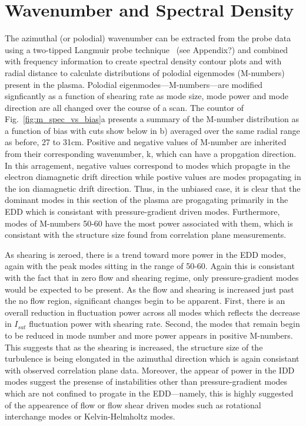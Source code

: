 \documentclass[aip,pop,amsmath,amssymb,preprint,superscriptaddress]{revtex4-1} %
\begin{document}
\section{Wavenumber and Spectral Density}

The azimuthal (or polodial) wavenumber can be extracted from the probe data using  a two-tipped Langmuir probe technique~\cite{beall82} (see Appendix?) and combined with frequency information to create spectral density contour plots and with radial distance to calculate distributions of polodial eigenmodes (M-numbers) present in the plasma. Polodial eigenmodes---M-numbers---are modified signficantly as a function of shearing rate as mode size, mode power and mode direction are all changed over the course of a scan. The countor of Fig.~\ref{fig:m_spec_vs_bias}a presents a summary of the M-number distribution as a function of bias with cuts show below in b) averaged over the same radial range as before, 27 to 31cm. Positive and negative values of M-number are inherited from their corresponding wavenumber, k, which can have a propgation direction. In this arragement, negative values correspond to modes which propagte in the electron diamagnetic drift direction while postive values are modes propagating in the ion diamagnetic drift direction. Thus, in the unbiased case, it is clear that the dominant modes in this section of the plasma are progagating primarily in the EDD which is consistant with pressure-gradient driven modes. Furthermore, modes of M-numbers 50-60 have the most power associated with them, which is consistant with the structure size found from correlation plane measurements.

As shearing is zeroed, there is a trend toward more power in the EDD modes, again with the peak modes sitting in the range of 50-60. Again this is consistant with the fact that in zero flow and shearing regime, only pressure-gradient modes would be expected to be present. As the flow and shearing is increased just past the no flow region, significant changes begin to be apparent. First, there is an overall reduction in fluctuation power across all modes which reflects the decrease in $I_{sat}$ fluctuation power with shearing rate. Second, the modes that remain begin to be reduced in mode number and more power appears in positive M-numbers. This suggests that as the shearing is increased, the structure size of the turbulence is being elongated in the azimuthal direction which is again consistant with observed correlation plane data. Moreover, the appear of power in the IDD modes suggest the presense of instabilities other than pressure-gradient modes which are not confined to progate in the EDD---namely, this is highly suggested of the appearence of flow or flow shear driven modes such as rotational interchange modes or Kelvin-Helmholtz modes.
\end{document}
